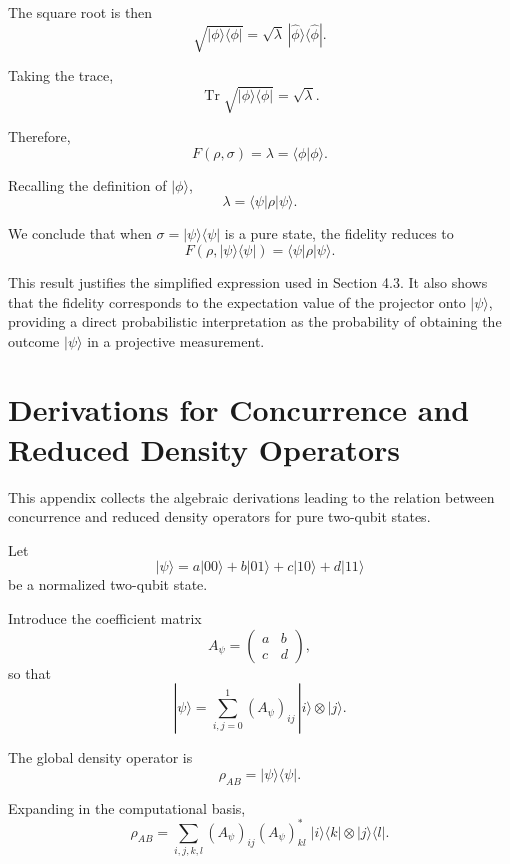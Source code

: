 \documentclass[a4paper]{article}
\begin{document}
The square root is then
\[
\sqrt{|\phi\rangle\langle\phi|}
=
\sqrt{\lambda}\,|\hat{\phi}\rangle\langle\hat{\phi}|.
\]

Taking the trace,
\[
\operatorname{Tr}\sqrt{|\phi\rangle\langle\phi|}
=
\sqrt{\lambda}.
\]

Therefore,
\[
F(\rho,\sigma)
=
\lambda
=
\langle \phi | \phi \rangle.
\]

Recalling the definition of $|\phi\rangle$,
\[
\lambda
=
\langle \psi | \rho | \psi \rangle.
\]

\medskip

We conclude that when $\sigma = |\psi\rangle\langle\psi|$ is a pure state, the fidelity reduces to
\[
F(\rho,|\psi\rangle\langle\psi|)
=
\langle \psi | \rho | \psi \rangle.
\]

\medskip

This result justifies the simplified expression used in Section 4.3. It also shows that the fidelity corresponds to the expectation value of the projector onto $|\psi\rangle$, providing a direct probabilistic interpretation as the probability of obtaining the outcome $|\psi\rangle$ in a projective measurement.



\section{Derivations for Concurrence and Reduced Density Operators}

This appendix collects the algebraic derivations leading to the relation between concurrence and reduced density operators for pure two-qubit states.

Let
\[
|\psi\rangle
=
a|00\rangle + b|01\rangle + c|10\rangle + d|11\rangle
\]
be a normalized two-qubit state.

Introduce the coefficient matrix
\[
A_\psi =
\begin{pmatrix}
a & b\\
c & d
\end{pmatrix},
\]
so that
\[
|\psi\rangle
=
\sum_{i,j=0}^{1} (A_\psi)_{ij}\,|i\rangle \otimes |j\rangle.
\]


The global density operator is
\[
\rho_{AB} = |\psi\rangle\langle\psi|.
\]

Expanding in the computational basis,
\[
\rho_{AB}
=
\sum_{i,j,k,l}
(A_\psi)_{ij}(A_\psi)^*_{kl}
\;
|i\rangle\langle k|
\otimes
|j\rangle\langle l|.
\]
\end{document}
